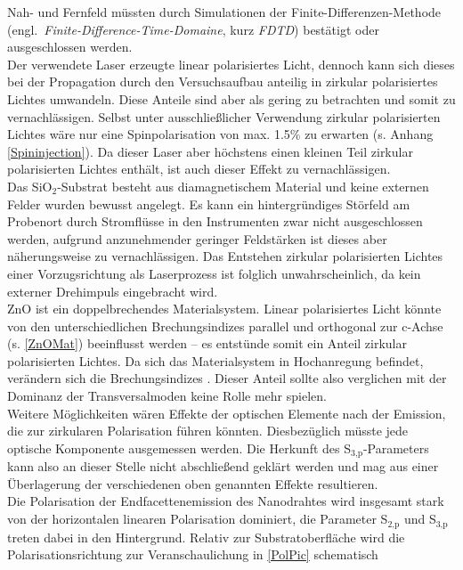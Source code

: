 Nah- und Fernfeld müssten durch Simulationen der Finite-Differenzen-Methode
\mbox{(engl. \textit{Finite-Difference-Time-Domaine},} kurz \textit{FDTD})
bestätigt oder ausgeschlossen werden. \\ Der verwendete Laser erzeugte linear
polarisiertes Licht, dennoch kann sich dieses  bei der Propagation durch den
Versuchsaufbau anteilig in zirkular polarisiertes Lichtes umwandeln. Diese
Anteile sind aber als gering zu betrachten und somit zu vernachlässigen. Selbst
unter ausschließlicher Verwendung zirkular polarisierten Lichtes wäre nur eine
Spinpolarisation von max. 1.5\% zu erwarten (s. Anhang \autoref{Spininjection}).
Da dieser Laser aber höchstens einen kleinen Teil zirkular polarisierten Lichtes
enthält, ist auch dieser Effekt zu vernachlässigen. \\ Das
SiO$_\text{2}$-Substrat besteht aus diamagnetischem Material und keine externen
Felder wurden bewusst angelegt. Es kann ein hintergründiges Störfeld am
Probenort durch Stromflüsse in den Instrumenten zwar nicht ausgeschlossen
werden, aufgrund anzunehmender geringer Feldstärken ist dieses aber
näherungsweise zu vernachlässigen. Das Entstehen zirkular polarisierten Lichtes
einer Vorzugsrichtung als Laserprozess ist folglich unwahrscheinlich, da kein
externer Drehimpuls eingebracht wird.\\ ZnO ist ein doppelbrechendes
Materialsystem. Linear polarisiertes Licht könnte von den unterschiedlichen
Brechungsindizes parallel und orthogonal zur c-Achse (s. \autoref{ZnOMat})
beeinflusst werden – es entstünde somit ein Anteil zirkular polarisierten
Lichtes. Da sich das Materialsystem in Hochanregung befindet, verändern sich die
Brechungsindizes \cite{Wille.2016}. Dieser Anteil sollte also verglichen mit der
Dominanz der Transversalmoden keine Rolle mehr spielen.\\ Weitere Möglichkeiten
wären Effekte der optischen Elemente nach der Emission, die zur zirkularen
Polarisation führen könnten. Diesbezüglich müsste jede optische Komponente
ausgemessen werden. Die Herkunft des S$_\text{3,p}$-Parameters kann also an
dieser Stelle nicht abschließend geklärt werden und mag aus einer Überlagerung
der verschiedenen oben genannten Effekte resultieren.\\ Die Polarisation der
Endfacettenemission des Nanodrahtes wird insgesamt stark von der horizontalen
linearen Polarisation dominiert, die Parameter S$_\text{2,p}$ und S$_\text{3,p}$
treten dabei in den Hintergrund. Relativ zur Substratoberfläche wird die
Polarisationsrichtung zur Veranschaulichung in \autoref{PolPic} schematisch
